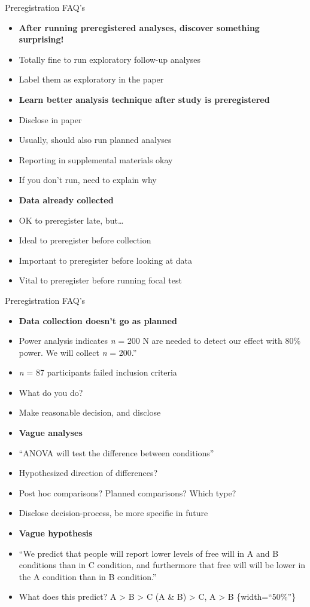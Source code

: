 \documentclass[
  ignorenonframetext,
  aspectratio=169,
]{beamer}
\providecommand{\tightlist}{%
  \setlength{\itemsep}{0pt}\setlength{\parskip}{0pt}}\usepackage{longtable,booktabs,array}
\begin{document}
\begin{frame}{Preregistration FAQ's}
\label{preregistration-faqs}
\begin{itemize}
\tightlist
\item
  \textbf{After running preregistered analyses, discover something
  surprising!}
\item
  Totally fine to run exploratory follow-up analyses
\item
  Label them as exploratory in the paper
\item
  \textbf{Learn better analysis technique after study is preregistered}
\item
  Disclose in paper
\item
  Usually, should also run planned analyses
\item
  Reporting in supplemental materials okay
\item
  If you don't run, need to explain why
\item
  \textbf{Data already collected}
\item
  OK to preregister late, but\ldots{}
\item
  Ideal to preregister before collection
\item
  Important to preregister before looking at data
\item
  Vital to preregister before running focal test
\end{itemize}
\end{frame}

\begin{frame}{Preregistration FAQ's}
\label{preregistration-faqs-1}
\begin{itemize}
\tightlist
\item
  \textbf{Data collection doesn't go as planned}
\item
  Power analysis indicates \emph{n} = 200 N are needed to detect our
  effect with 80\% power. We will collect \emph{n} = 200.''
\item
  \emph{n} = 87 participants failed inclusion criteria
\item
  What do you do?
\item
  Make reasonable decision, and disclose
\item
  \textbf{Vague analyses}
\item
  ``ANOVA will test the difference between conditions''
\item
  Hypothesized direction of differences?
\item
  Post hoc comparisons? Planned comparisons? Which type?
\item
  Disclose decision-process, be more specific in future
\item
  \textbf{Vague hypothesis}
\item
  ``We predict that people will report lower levels of free will in A
  and B conditions than in C condition, and furthermore that free will
  will be lower in the A condition than in B condition.''
\item
  What does this predict? A \textgreater{} B \textgreater{} C (A \& B)
  \textgreater{} C, A \textgreater{} B \{width=``50\%''\}
\end{itemize}
\end{frame}
\end{document}
